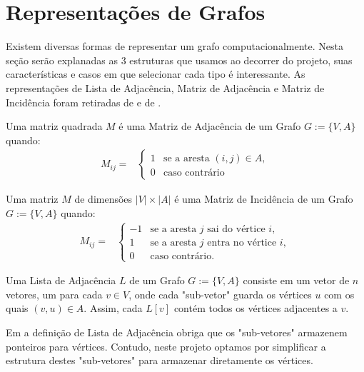 \chapter{Representações de Grafos}
\label{ch:representation} %

Existem diversas formas de representar um grafo computacionalmente. Nesta seção serão explanadas as 3 estruturas que usamos ao decorrer do projeto, suas características e casos em que selecionar cada tipo é interessante.
As representações de Lista de Adjacência, Matriz de Adjacência e Matriz de Incidência foram retiradas de \cite{skiena2008algo} e de \cite{cormenEtAl2009algo}.

\begin{mydef}
  Uma matriz quadrada $M$ é uma Matriz de Adjacência de um Grafo $G := \{V, A\}$ quando:
  \begin{align*}
      M_{ij} ={}& \left\{
      \begin{array}{ll}
        1 & \text{se a aresta } (i, j) \in A, \\
        0 & \text{caso contrário}
      \end{array}
      \right.
    \end{align*}
\end{mydef}

\begin{mydef}
  Uma matriz $M$ de dimensões $|V| \times |A|$ é uma Matriz de Incidência de um Grafo $G := \{V, A\}$ quando:
    \begin{align*}
    M_{ij} ={}& \left\{
    \begin{array}{ll}
      -1 & \text{se a aresta } j \text{ sai do vértice } i, \\
      1 & \text{se a aresta } j \text{ entra no vértice } i, \\
      0 & \text{caso contrário}.
    \end{array}
    \right.
  \end{align*}
\end{mydef}

\begin{mydef}
  Uma Lista de Adjacência $L$ de um Grafo $G := \{V, A \}$ consiste em um vetor de $n$ vetores, um para cada $v \in V$,
  onde cada "sub-vetor" guarda os vértices $u$ com os quais $(v, u) \in A$.
  Assim, cada $L[v]$ contém todos os vértices adjacentes a $v$.
\end{mydef}

Em \cite{skiena2008algo} a definição de Lista de Adjacência obriga que os "sub-vetores" armazenem ponteiros para vértices. Contudo, neste projeto optamos por simplificar a estrutura destes "sub-vetores" para armazenar diretamente os vértices. \\


